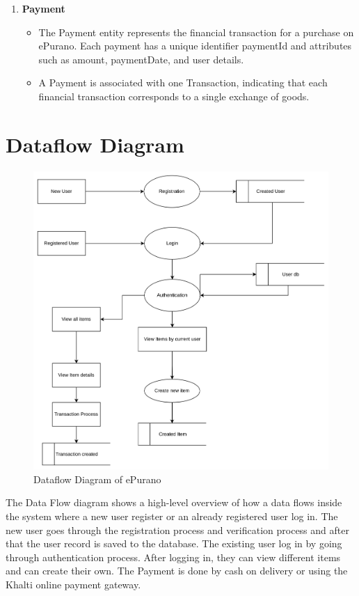 \begin{enumerate}
    \item \textbf{Payment}
    \begin{itemize}
        \item The Payment entity represents the financial transaction for a purchase on ePurano. Each payment has a unique identifier paymentId and attributes such as amount, paymentDate, and user details.
        \item A Payment is associated with one Transaction, indicating that each financial transaction corresponds to a single exchange of goods.
    \end{itemize}
    
\end{enumerate}
\newpage

\section{Dataflow Diagram}
\begin{figure}[ht]
    \centering
    \includegraphics[scale=0.15]{../images/dataflow.png}
    \caption{Dataflow Diagram of ePurano}%
    \label{fig:data_flow_diagram}
\end{figure}

The Data Flow diagram shows a high-level overview of how a data flows inside the system where a new user register or an already registered user log in. The new user goes through the registration process and verification process and after that the user record is saved to the database. The existing user log in by going through authentication process. After logging in, they can view different items and can create their own. The Payment is done by cash on delivery or using the Khalti online payment gateway.

